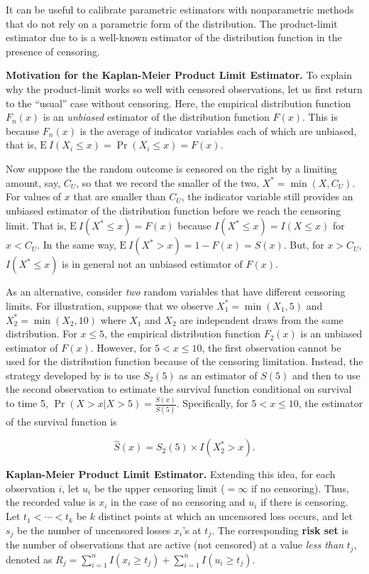 \documentclass[]{book}
\theoremstyle{definition}
\theoremstyle{definition}
\theoremstyle{definition}
\theoremstyle{remark}
\begin{document}
It can be useful to calibrate parametric estimators with nonparametric
methods that do not rely on a parametric form of the distribution. The
product-limit estimator due to \citep{kaplan1958} is a well-known
estimator of the distribution function in the presence of censoring.

\textbf{Motivation for the Kaplan-Meier Product Limit Estimator.} To
explain why the product-limit works so well with censored observations,
let us first return to the ``usual'' case without censoring. Here, the
empirical distribution function \(F_n(x)\) is an \emph{unbiased}
estimator of the distribution function \(F(x)\). This is because
\(F_n(x)\) is the average of indicator variables each of which are
unbiased, that is, \(\mathrm{E~} I(X_i \le x) = \Pr(X_i \le x) = F(x)\).

Now suppose the the random outcome is censored on the right by a
limiting amount, say, \(C_U\), so that we record the smaller of the two,
\(X^* = \min(X, C_U)\). For values of \(x\) that are smaller than
\(C_U\), the indicator variable still provides an unbiased estimator of
the distribution function before we reach the censoring limit. That is,
\(\mathrm{E~} I(X^* \le x) = F(x)\) because
\(I(X^* \le x) = I(X \le x)\) for \(x < C_U\). In the same way,
\(\mathrm{E~} I(X^* > x) = 1 -F(x) = S(x)\). But, for \(x>C_U\),
\(I(X^* \le x)\) is in general not an unbiased estimator of \(F(x)\).

As an alternative, consider \emph{two} random variables that have
different censoring limits. For illustration, suppose that we observe
\(X_1^* = \min(X_1, 5)\) and \(X_2^* = \min(X_2, 10)\) where \(X_1\) and
\(X_2\) are independent draws from the same distribution. For
\(x \le 5\), the empirical distribution function \(F_2(x)\) is an
unbiased estimator of \(F(x)\). However, for \(5 < x \le 10\), the first
observation cannot be used for the distribution function because of the
censoring limitation. Instead, the strategy developed by
\citep{kaplan1958} is to use \(S_2(5)\) as an estimator of \(S(5)\) and
then to use the second observation to estimate the survival function
conditional on survival to time 5,
\(\Pr(X > x | X >5) = \frac{S(x)}{S(5)}\). Specifically, for
\(5 < x \le 10\), the estimator of the survival function is

\[
\hat{S}(x) = S_2(5) \times I(X_2^* > x ) .
\]

\textbf{Kaplan-Meier Product Limit Estimator.} Extending this idea, for
each observation \(i\), let \(u_i\) be the upper censoring limit
(\(=\infty\) if no censoring). Thus, the recorded value is \(x_i\) in
the case of no censoring and \(u_i\) if there is censoring. Let
\(t_{1} <\cdots< t_{k}\) be \(k\) distinct points at which an uncensored
loss occurs, and let \(s_j\) be the number of uncensored losses
\(x_i\)'s at \(t_{j}\). The corresponding \textbf{risk set} is the
number of observations that are active (not censored) at a value
\emph{less than} \(t_{j}\), denoted as
\(R_j = \sum_{i=1}^n I(x_i \geq t_{j}) + \sum_{i=1}^n I(u_i \geq t_{j})\).
\end{document}
